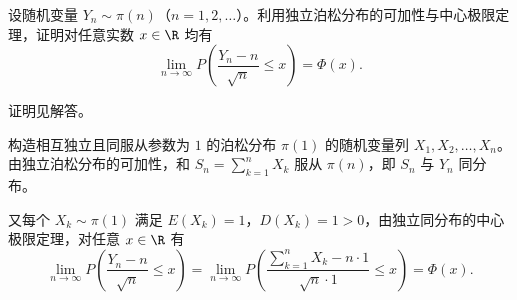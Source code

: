 \begin{exercise}
设随机变量 $Y_n\sim\pi(n)$（$n=1,2,\ldots$）。利用独立泊松分布的可加性与中心极限定理，证明对任意实数 $x\in\R$ 均有
\[
  \lim_{n\to\infty}P\!\left(\frac{Y_n-n}{\sqrt{n}}\le x\right)=\Phi(x).
\]
\begin{answer}
证明见解答。
\end{answer}
\begin{solution}
构造相互独立且同服从参数为 $1$ 的泊松分布 $\pi(1)$ 的随机变量列 $X_1,X_2,\ldots,X_n$。由独立泊松分布的可加性，和 $S_n=\sum_{k=1}^{n}X_k$ 服从 $\pi(n)$，即 $S_n$ 与 $Y_n$ 同分布。

又每个 $X_k\sim\pi(1)$ 满足 $E(X_k)=1$，$D(X_k)=1>0$，由独立同分布的中心极限定理，对任意 $x\in\R$ 有
\[
  \lim_{n\to\infty}P\!\left(\frac{Y_n-n}{\sqrt{n}}\le x\right)
  =\lim_{n\to\infty}P\!\left(\frac{\sum_{k=1}^{n}X_k-n\cdot 1}{\sqrt{n}\cdot 1}\le x\right)
  =\Phi(x).
\]
\end{solution}
\end{exercise}
